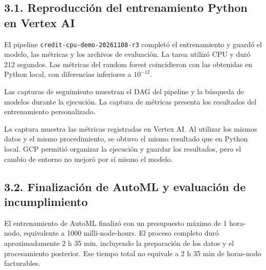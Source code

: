 
\subsection{3.1. Reproducción del entrenamiento Python en Vertex AI}

El pipeline \nolinkurl{credit-cpu-demo-20261108-r3} completó el entrenamiento y guardó el modelo, las métricas y los archivos de evaluación. La tarea utilizó CPU y duró 212 segundos. Las métricas del random forest coincidieron con las obtenidas en Python local, con diferencias inferiores a \(10^{-12}\).


Las capturas de seguimiento muestran el DAG del pipeline y la búsqueda de modelos durante la ejecución. La captura de métricas presenta los resultados del entrenamiento personalizado.




La captura muestra las métricas registradas en Vertex AI. Al utilizar los mismos datos y el mismo procedimiento, se obtuvo el mismo resultado que en Python local. GCP permitió organizar la ejecución y guardar los resultados, pero el cambio de entorno no mejoró por sí mismo el modelo.


\FloatBarrier


\subsection{3.2. Finalización de AutoML y evaluación de incumplimiento}

El entrenamiento de AutoML finalizó con un presupuesto máximo de 1 hora-nodo, equivalente a 1000 milli-node-hours. El proceso completo duró aproximadamente 2 h 35 min, incluyendo la preparación de los datos y el procesamiento posterior. Ese tiempo total no equivale a 2 h 35 min de horas-nodo facturables.






